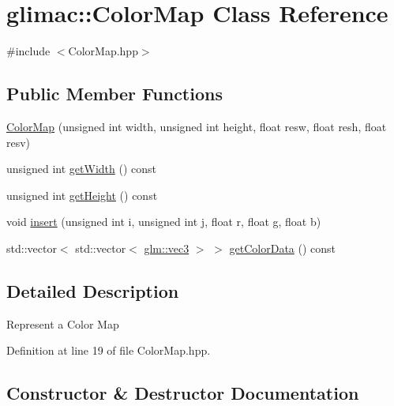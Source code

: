 \hypertarget{classglimac_1_1_color_map}{}\section{glimac\+:\+:Color\+Map Class Reference}
\label{classglimac_1_1_color_map}


{\ttfamily \#include $<$Color\+Map.\+hpp$>$}

\subsection*{Public Member Functions}
\begin{DoxyCompactItemize}
\item 
\hyperlink{classglimac_1_1_color_map_a3df6bdd6b30e844e1444581eff5876f6}{Color\+Map} (unsigned int width, unsigned int height, float resw, float resh, float resv)
\item 
unsigned int \hyperlink{classglimac_1_1_color_map_a760221f166c7194706706ecb1b01f289}{get\+Width} () const
\item 
unsigned int \hyperlink{classglimac_1_1_color_map_a863f67a6f8da5b60cd24960e2213d99f}{get\+Height} () const
\item 
void \hyperlink{classglimac_1_1_color_map_ade62811c7a95b53010f2836018639f0b}{insert} (unsigned int i, unsigned int j, float r, float g, float b)
\item 
std\+::vector$<$ std\+::vector$<$ \hyperlink{group__core__types_ga1c47e8b3386109bc992b6c48e91b0be7}{glm\+::vec3} $>$ $>$ \hyperlink{classglimac_1_1_color_map_a2f7ab5c97d42782cbde567a261a3c099}{get\+Color\+Data} () const
\end{DoxyCompactItemize}


\subsection{Detailed Description}
Represent a Color Map 

Definition at line 19 of file Color\+Map.\+hpp.



\subsection{Constructor \& Destructor Documentation}
\mbox{\label{classglimac_1_1_color_map_a3df6bdd6b30e844e1444581eff5876f6}} 

